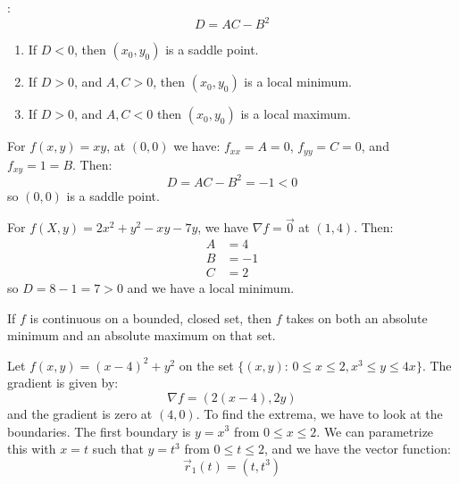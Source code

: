 \begin{itemize}
\begin{theorem}
{        }:
        \begin{equation}
            D = AC - B^2
        \end{equation}
        \begin{enumerate}
            \item If $D < 0 $, then $(x_0, y_0)$ is a saddle point.
            \item If $D >0$, and $A,C > 0$, then $(x_0, y_0)$ is a local minimum.
            \item If $D > 0$, and $A,C < 0$ then $(x_0, y_0)$ is a local maximum.
        \end{enumerate}
    \end{theorem}
    \begin{example}
        For $f(x,y) = xy$, at $(0,0)$ we have: $f_{xx} = A = 0$, $f_{yy} = C = 0$, and $f_{xy} = 1 = B$. Then:
        \begin{equation}
            D=AC-B^2 = -1 < 0
        \end{equation}
        so $(0,0)$ is a saddle point.
    \end{example}
    \begin{example}
        For $f(X,y) = 2x^2+y^2-xy-7y$, we have $\nabla f = \vec{0}$ at $(1,4)$. Then:
        \begin{align}
            A &= 4 \\
            B &= -1 \\ 
            C &= 2
        \end{align}
        so $D = 8 -1 = 7 > 0$ and we have a local minimum.
    \end{example}
    \begin{theorem}
        If $f$ is continuous on a bounded, closed set, then $f$ takes on both an absolute minimum and an absolute maximum on that set.
    \end{theorem}
    \begin{example}
        Let $f(x,y) = (x-4)^2 + y^2$ on the set $\{(x,y):\, 0 \le x \le 2, x^3 \le y \le 4x\}$. The gradient is given by:
        \begin{equation}
            \nabla f = (2(x-4), 2y)
        \end{equation}
        and the gradient is zero at $(4,0)$. To find the extrema, we have to look at the boundaries. The first boundary is $y=x^3$ from $0 \le x \le 2$. We can parametrize this with $x=t$ such that $y=t^3$ from $0 \le t \le 2$, and we have the vector function:
        \begin{equation}
            \vec{r}_1(t) = (t, t^3)

\end{equation}
\end{example}
\end{itemize}
